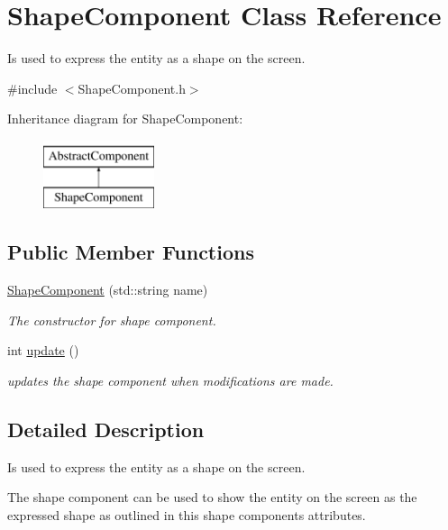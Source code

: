\hypertarget{class_shape_component}{\section{Shape\-Component Class Reference}
\label{df/d41/class_shape_component}
}


Is used to express the entity as a shape on the screen.  




{\ttfamily \#include $<$Shape\-Component.\-h$>$}

Inheritance diagram for Shape\-Component\-:\begin{figure}[H]
\begin{center}
\leavevmode
\includegraphics[height=2.000000cm]{df/d41/class_shape_component}
\end{center}
\end{figure}
\subsection*{Public Member Functions}
\begin{DoxyCompactItemize}
\item 
\hyperlink{class_shape_component_a8e09d5e1624ee3b78ebed9abff0c3436}{Shape\-Component} (std\-::string name)
\begin{DoxyCompactList}\small\item\em The constructor for shape component. \end{DoxyCompactList}\item 
int \hyperlink{class_shape_component_ae62aa31a3d5c65c675243fdcc5f60904}{update} ()
\begin{DoxyCompactList}\small\item\em updates the shape component when modifications are made. \end{DoxyCompactList}\end{DoxyCompactItemize}


\subsection{Detailed Description}
Is used to express the entity as a shape on the screen. 

The shape component can be used to show the entity on the screen as the expressed shape as outlined in this shape components attributes.

